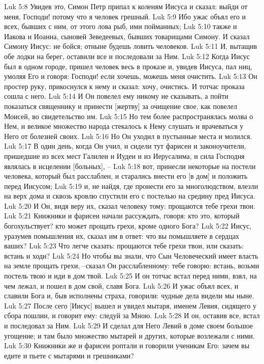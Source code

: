 Luk 5:8  Увидев это, Симон Петр припал к коленям Иисуса и сказал: выйди от меня, Господи! потому что я человек грешный.
Luk 5:9  Ибо ужас объял его и всех, бывших с ним, от этого лова рыб, ими пойманных;
Luk 5:10  также и Иакова и Иоанна, сыновей Зеведеевых, бывших товарищами Симону. И сказал Симону Иисус: не бойся; отныне будешь ловить человеков.
Luk 5:11  И, вытащив обе лодки на берег, оставили все и последовали за Ним.
Luk 5:12  Когда Иисус был в одном городе, пришел человек весь в проказе и, увидев Иисуса, пал ниц, умоляя Его и говоря: Господи! если хочешь, можешь меня очистить.
Luk 5:13  Он простер руку, прикоснулся к нему и сказал: хочу, очистись. И тотчас проказа сошла с него.
Luk 5:14  И Он повелел ему никому не сказывать, а пойти показаться священнику и принести [жертву] за очищение свое, как повелел Моисей, во свидетельство им.
Luk 5:15  Но тем более распространялась молва о Нем, и великое множество народа стекалось к Нему слушать и врачеваться у Него от болезней своих.
Luk 5:16  Но Он уходил в пустынные места и молился.
Luk 5:17  В один день, когда Он учил, и сидели тут фарисеи и законоучители, пришедшие из всех мест Галилеи и Иудеи и из Иерусалима, и сила Господня являлась в исцелении [больных], --
Luk 5:18  вот, принесли некоторые на постели человека, который был расслаблен, и старались внести его [в дом] и положить перед Иисусом;
Luk 5:19  и, не найдя, где пронести его за многолюдством, влезли на верх дома и сквозь кровлю спустили его с постелью на средину пред Иисуса.
Luk 5:20  И Он, видя веру их, сказал человеку тому: прощаются тебе грехи твои.
Luk 5:21  Книжники и фарисеи начали рассуждать, говоря: кто это, который богохульствует? кто может прощать грехи, кроме одного Бога?
Luk 5:22  Иисус, уразумев помышления их, сказал им в ответ: что вы помышляете в сердцах ваших?
Luk 5:23  Что легче сказать: прощаются тебе грехи твои, или сказать: встань и ходи?
Luk 5:24  Но чтобы вы знали, что Сын Человеческий имеет власть на земле прощать грехи, --сказал Он расслабленному: тебе говорю: встань, возьми постель твою и иди в дом твой.
Luk 5:25  И он тотчас встал перед ними, взял, на чем лежал, и пошел в дом свой, славя Бога.
Luk 5:26  И ужас объял всех, и славили Бога и, быв исполнены страха, говорили: чудные дела видели мы ныне.
Luk 5:27  После сего [Иисус] вышел и увидел мытаря, именем Левия, сидящего у сбора пошлин, и говорит ему: следуй за Мною.
Luk 5:28  И он, оставив все, встал и последовал за Ним.
Luk 5:29  И сделал для Него Левий в доме своем большое угощение; и там было множество мытарей и других, которые возлежали с ними.
Luk 5:30  Книжники же и фарисеи роптали и говорили ученикам Его: зачем вы едите и пьете с мытарями и грешниками?
